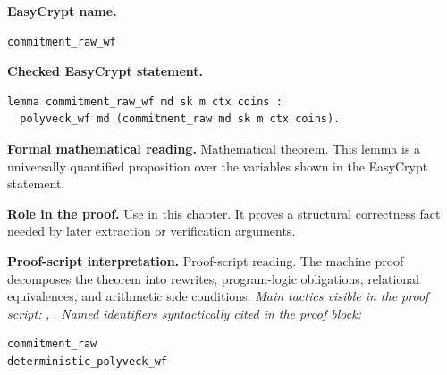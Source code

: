 \begin{formaltheorem}
\noindent\textbf{EasyCrypt name.}
\begin{lstlisting}[language=EasyCrypt,basicstyle=\ttfamily\scriptsize]
commitment_raw_wf
\end{lstlisting}
\noindent\textbf{Checked EasyCrypt statement.}
\begin{lstlisting}[language=EasyCrypt,basicstyle=\ttfamily\scriptsize]
lemma commitment_raw_wf md sk m ctx coins :
  polyveck_wf md (commitment_raw md sk m ctx coins).
\end{lstlisting}
\noindent\textbf{Formal mathematical reading.}
Mathematical theorem. This lemma is a universally quantified proposition over the variables shown in the EasyCrypt statement.

\noindent\textbf{Role in the proof.}
Use in this chapter. It proves a structural correctness fact needed by later extraction or verification arguments.

\noindent\textbf{Proof-script interpretation.}
Proof-script reading. The machine proof decomposes the theorem into rewrites, program-logic obligations, relational equivalences, and arithmetic side conditions.
\emph{Main tactics visible in the proof script:} , .
\emph{Named identifiers syntactically cited in the proof block:}
\begin{lstlisting}[language=EasyCrypt,basicstyle=\ttfamily\scriptsize]
commitment_raw
deterministic_polyveck_wf
\end{lstlisting}

\end{formaltheorem}

